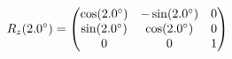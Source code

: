 \documentclass[preview]{standalone}
\begin{document}
\begin{align*}
\special{dvisvgm:raw <g id='unique000'>}R_z(2.0^\circ) = \begin{pmatrix} \cos(2.0^\circ) & -\sin(2.0^\circ) & 0 \\ \sin(2.0^\circ) & \cos(2.0^\circ) & 0 \\ 0 & 0 & 1 \end{pmatrix}\special{dvisvgm:raw </g>}
\end{align*}
\end{document}
